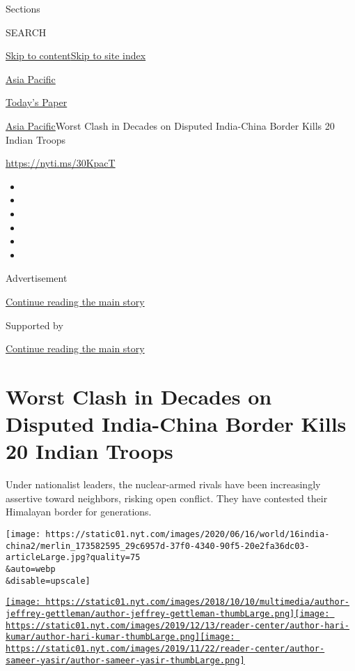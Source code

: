 Sections

SEARCH

\protect\hyperlink{site-content}{Skip to
content}\protect\hyperlink{site-index}{Skip to site index}

\href{https://www.nytimes.com/section/world/asia}{Asia Pacific}

\href{https://myaccount.nytimes.com/auth/login?response_type=cookie\&client_id=vi}{}

\href{https://www.nytimes.com/section/todayspaper}{Today's Paper}

\href{/section/world/asia}{Asia Pacific}\textbar{}Worst Clash in Decades
on Disputed India-China Border Kills 20 Indian Troops

\url{https://nyti.ms/30KpacT}

\begin{itemize}
\item
\item
\item
\item
\item
\item
\end{itemize}

Advertisement

\protect\hyperlink{after-top}{Continue reading the main story}

Supported by

\protect\hyperlink{after-sponsor}{Continue reading the main story}

\hypertarget{worst-clash-in-decades-on-disputed-india-china-border-kills-20-indian-troops}{%
\section{Worst Clash in Decades on Disputed India-China Border Kills 20
Indian
Troops}\label{worst-clash-in-decades-on-disputed-india-china-border-kills-20-indian-troops}}

Under nationalist leaders, the nuclear-armed rivals have been
increasingly assertive toward neighbors, risking open conflict. They
have contested their Himalayan border for generations.

\texttt{[image: https://static01.nyt.com/images/2020/06/16/world/16india-china2/merlin\_173582595\_29c6957d-37f0-4340-90f5-20e2fa36dc03-articleLarge.jpg?quality=75\\\&auto=webp\\\&disable=upscale]}

\href{https://www.nytimes.com/by/jeffrey-gettleman}{\texttt{[image: https://static01.nyt.com/images/2018/10/10/multimedia/author-jeffrey-gettleman/author-jeffrey-gettleman-thumbLarge.png]}}\href{https://www.nytimes.com/by/hari-kumar}{\texttt{[image: https://static01.nyt.com/images/2019/12/13/reader-center/author-hari-kumar/author-hari-kumar-thumbLarge.png]}}\href{https://www.nytimes.com/by/sameer-yasir}{\texttt{[image: https://static01.nyt.com/images/2019/11/22/reader-center/author-sameer-yasir/author-sameer-yasir-thumbLarge.png]}}

